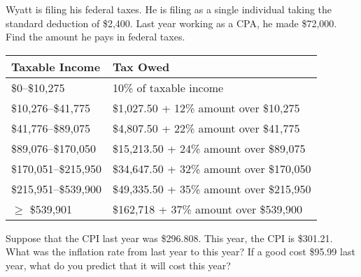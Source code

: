 \documentclass[11pt,letterpaper]{article}
\begin{document}

 Wyatt is filing his federal taxes. He is filing as a single individual taking the standard deduction of \$2,400. Last year working as a CPA, he made \$72,000. Find the amount he pays in federal taxes. 
	\begin{table}[!ht]
	\centering
	\begin{tabular}{|l|l|} \hline
	Taxable Income & Tax Owed \\ \hline \hline
	\$0--\$10,275 & 10\% of taxable income \\ \hline
	\$10,276--\$41,775 & \$1,027.50 + 12\% amount over \$10,275 \\ \hline
	\$41,776--\$89,075 & \$4,807.50 + 22\% amount over \$41,775 \\ \hline
	\$89,076--\$170,050 & \$15,213.50 + 24\% amount over \$89,075 \\ \hline
	\$170,051--\$215,950 & \$34,647.50 + 32\% amount over \$170,050 \\ \hline
	\$215,951--\$539,900 & \$49,335.50 + 35\% amount over \$215,950 \\ \hline
	$\geq$ \$539,901 & \$162,718 + 37\% amount over \$539,900 \\ \hline
	\end{tabular}
	\end{table}



\newpage



 Suppose that the CPI last year was \$296.808. This year, the CPI is \$301.21. What was the inflation rate from last year to this year? If a good cost \$95.99 last year, what do you predict that it will cost this year?
\end{document}
